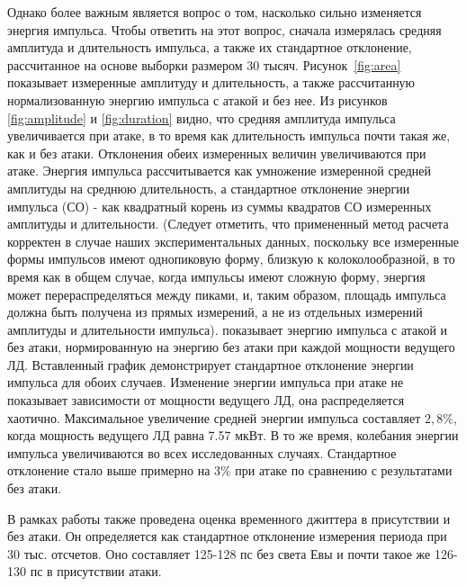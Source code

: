 Однако более важным является вопрос о том, насколько сильно изменяется энергия импульса. Чтобы ответить на этот вопрос, сначала измерялась средняя амплитуда и длительность импульса, а также их стандартное отклонение, рассчитанное на основе выборки размером 30 тысяч. Рисунок~\ref{fig:area} показывает измеренные амплитуду и длительность, а также рассчитанную нормализованную энергию импульса с атакой и без нее. Из рисунков \ref{fig:amplitude} и \ref{fig:duration} видно, что средняя амплитуда импульса увеличивается при атаке, в то время как длительность импульса почти такая же, как и без атаки. Отклонения обеих измеренных величин увеличиваются при атаке. Энергия импульса рассчитывается как умножение измеренной средней амплитуды на среднюю длительность, а стандартное отклонение энергии импульса (СО) - как квадратный корень из суммы квадратов СО измеренных амплитуды и длительности. (Следует отметить, что примененный метод расчета корректен в случае наших экспериментальных данных, поскольку все измеренные формы импульсов имеют однопиковую форму, близкую к колоколообразной, в то время как в общем случае, когда импульсы имеют сложную форму, энергия может перераспределяться между пиками, и, таким образом, площадь импульса должна быть получена из прямых измерений, а не из отдельных измерений амплитуды и длительности импульса).  показывает энергию импульса с атакой и без атаки, нормированную на энергию без атаки при каждой мощности ведущего ЛД. Вставленный график демонстрирует стандартное отклонение энергии импульса для обоих случаев. Изменение энергии импульса при атаке не показывает зависимости от мощности ведущего ЛД, она распределяется хаотично. Максимальное увеличение средней энергии импульса составляет $2,8\%$, когда мощность ведущего ЛД равна 7.57 мкВт. В то же время, колебания энергии импульса увеличиваются во всех исследованных случаях. Стандартное отклонение стало выше примерно на 3\% при атаке по сравнению с результатами без атаки.

В рамках работы также проведена оценка временного джиттера в присутствии и без атаки. Он определяется как стандартное отклонение измерения периода при 30 тыс. отсчетов. Оно составляет 125-128 пс без света Евы и почти такое же 126-130 пс в присутствии атаки. 

